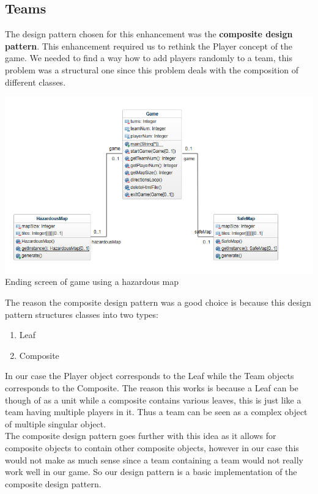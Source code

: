 \documentclass[a4paper,12pt]{extarticle}
\begin{document}
\newpage
\subsection{Teams}
The design pattern chosen for this enhancement was the \textbf{composite design pattern}. This enhancement required us to rethink the Player concept of the game. We needed to find a way how to add players randomly to a team, this problem was a structural one since this problem deals with the composition of different classes.\\

\begin{center}
\includegraphics[scale=0.5]{Enhancement2CD.png}\\
Ending screen of game using a hazardous map
\end{center}

\noindent The reason the composite design pattern was a good choice is because this design pattern structures classes into two types:

\begin{enumerate}
\item Leaf
\item Composite
\end{enumerate}

\noindent In our case the Player object corresponds to the Leaf while the Team objects  corresponds to the Composite. The reason this works is because a Leaf can be though of as a unit while a composite contains various leaves, this is just like a team having multiple players in it. Thus a team can be seen as a complex object of multiple singular object.\\

\noindent The composite design pattern goes further with this idea as it allows for composite objects to contain other composite objects, however in our case this would not make as much sense since a team containing a team would not really work well in our game. So our design pattern is a basic implementation of the composite design pattern.\\
\end{document}
